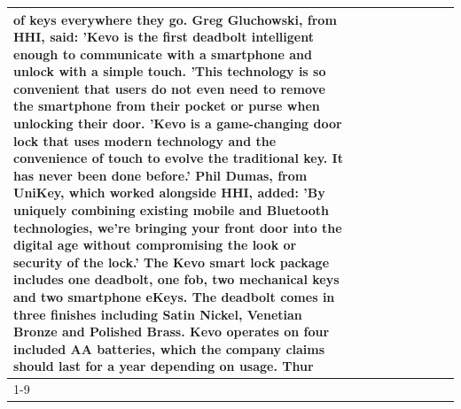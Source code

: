 \begin{table}[H]
\begin{tabular}{lllrlllll}
of keys everywhere they go. Greg Gluchowski, from HHI, said: 'Kevo is the first deadbolt intelligent enough to communicate with a smartphone and unlock with a simple touch. 'This technology is so convenient that users do not even need to remove the smartphone from their pocket or purse when unlocking their door. 'Kevo is a game-changing door lock that uses modern technology and the convenience of touch to evolve the traditional key. It has never been done before.' Phil Dumas, from UniKey, which worked alongside HHI, added: 'By uniquely combining existing mobile and Bluetooth technologies, we’re bringing your front door into the digital age without compromising the look or security of the lock.' The Kevo smart lock package includes one deadbolt, one fob, two mechanical keys and two smartphone eKeys. The deadbolt comes in three finishes including Satin Nickel, Venetian Bronze and Polished Brass. Kevo operates on four included AA batteries, which the company claims should last for a year depending on usage. Thur \\
\cline{1-9}

\end{tabular}
\end{table}
